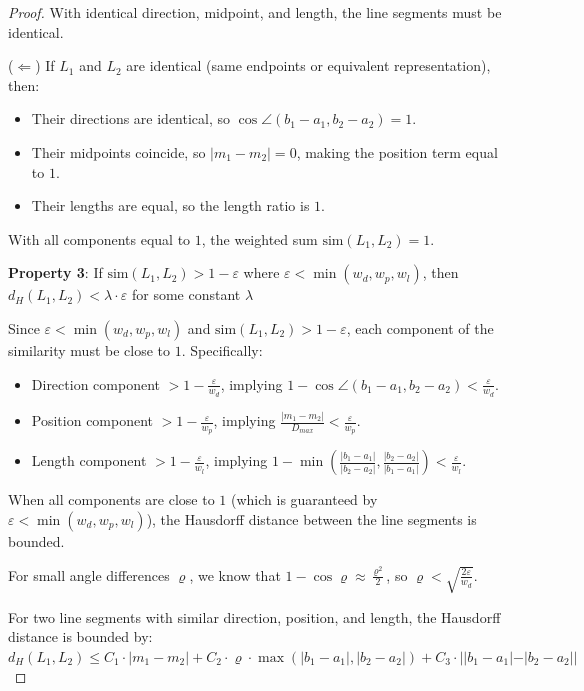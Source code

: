\documentclass[numbers,sort]{article}
\begin{document}
\begin{proof}
With identical direction, midpoint, and length, the line segments must be identical.

($\Leftarrow$) If $L_1$ and $L_2$ are identical (same endpoints or equivalent representation), then:
\begin{itemize}
\item Their directions are identical, so $\cos\angle(b_1-a_1, b_2-a_2) = 1$.
\item Their midpoints coincide, so $|m_1 - m_2| = 0$, making the position term equal to $1$.
\item Their lengths are equal, so the length ratio is $1$.
\end{itemize}

With all components equal to $1$, the weighted sum $\text{sim}(L_1, L_2) = 1$.

\textbf{Property 3}: If $\text{sim}(L_1, L_2) > 1 - \varepsilon$ where $\varepsilon < \min(w_d, w_p, w_l)$, then $d_H(L_1, L_2) < \lambda \cdot \varepsilon$ for some constant $\lambda$

Since $\varepsilon < \min(w_d, w_p, w_l)$ and $\text{sim}(L_1, L_2) > 1 - \varepsilon$, each component of the similarity must be close to $1$. Specifically:

\begin{itemize}
\item Direction component $> 1 - \frac{\varepsilon}{w_d}$, implying $1 - \cos\angle(b_1-a_1, b_2-a_2) < \frac{\varepsilon}{w_d}$.
\item Position component $> 1 - \frac{\varepsilon}{w_p}$, implying $\frac{|m_1 - m_2|}{D_{max}} < \frac{\varepsilon}{w_p}$.
\item Length component $> 1 - \frac{\varepsilon}{w_l}$, implying $1 - \min\left(\frac{|b_1-a_1|}{|b_2-a_2|}, \frac{|b_2-a_2|}{|b_1-a_1|}\right) < \frac{\varepsilon}{w_l}$.
\end{itemize}

When all components are close to $1$ (which is guaranteed by $\varepsilon < \min(w_d, w_p, w_l)$), the Hausdorff distance between the line segments is bounded.

For small angle differences $\varrho$, we know that $1-\cos\varrho \approx \frac{\varrho^2}{2}$, so $\varrho < \sqrt{\frac{2\varepsilon}{w_d}}$.

For two line segments with similar direction, position, and length, the Hausdorff distance is bounded by:
$d_H(L_1, L_2) \leq C_1 \cdot |m_1 - m_2| + C_2 \cdot \varrho \cdot \max(|b_1-a_1|, |b_2-a_2|) + C_3 \cdot ||b_1-a_1| - |b_2-a_2||$


\end{proof}
\end{document}
